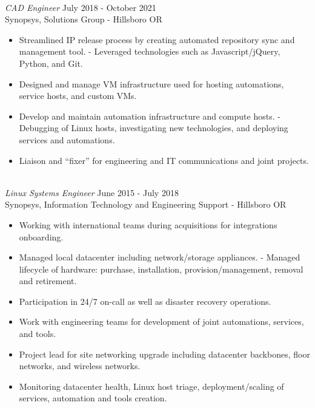 \documentclass[line,margin]{res}
\begin{document}
\begin{resume}
\begin{adjustwidth}{-115pt}{0pt}
\begin{itemize}
		\end{itemize}
	\hfill\\
	{\sl CAD Engineer}
		\hfill July 2018 - October 2021\\
		Synopsys, Solutions Group - Hillsboro OR
		\begin{itemize}
			\item Streamlined IP release process by creating automated repository sync and management tool.
				\subitem - Leveraged technologies such as Javascript/jQuery, Python, and Git. 
			\item Designed and manage VM infrastructure used for hosting automations, service hosts, and custom VMs.
			\item Develop and maintain automation infrastructure and compute hosts.
				\subitem - Debugging of Linux hosts, investigating new technologies, and deploying services and automations.
			\item Liaison and “fixer” for engineering and IT communications and joint projects.
		\end{itemize}
	\hfill\\
	{\sl Linux Systems Engineer}
		\hfill June 2015 - July 2018\\
		Synopsys, Information Technology and Engineering Support - Hillsboro OR
		\begin{itemize}
			\item Working with international teams during acquisitions for integrations onboarding.
			\item Managed local datacenter including network/storage appliances.
				\subitem - Managed lifecycle of hardware: purchase, installation, provision/management, removal and retirement.
			\item Participation in 24/7 on-call as well as disaster recovery operations.
			\item Work with engineering teams for development of joint automations, services, and tools.
			\item Project lead for site networking upgrade including datacenter backbones, floor networks, and wireless networks.
			\item Monitoring datacenter health, Linux host triage, deployment/scaling of services, automation and tools creation.
		\end{itemize}


\end{adjustwidth}
\end{resume}
\end{document}
